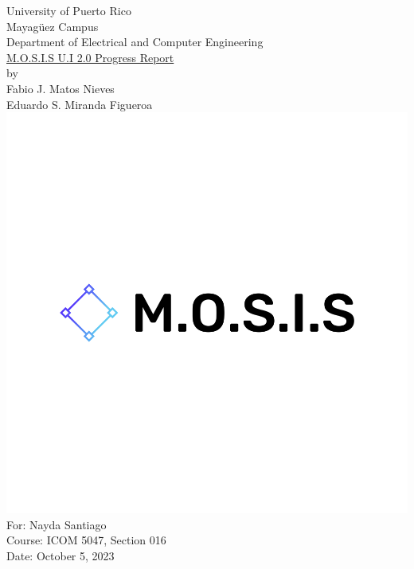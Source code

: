 \linespread{1.0}
\begin{titlepage}
	\begin{center}
		\large{University of Puerto Rico\\
			Mayagüez Campus\\
			\vspace{\baselineskip}
			Department of Electrical and Computer Engineering}\\
		\vspace{5\baselineskip}
		\Huge{\underline{M.O.S.I.S U.I 2.0 Progress Report}\\}
		\vspace{\baselineskip}
		\large by\\
		Fabio J. Matos Nieves\\
		Eduardo S. Miranda Figueroa\\
		\normalsize
		\includegraphics[scale=0.15]{../../M.O.S.I.S Logo/default.png}\\
		\vspace{4\baselineskip}
		\large
		For: Nayda Santiago\\
		Course: ICOM 5047, Section 016\\
		Date: October 5, 2023\\
		\normalsize

	\end{center}
\end{titlepage}